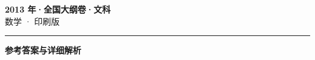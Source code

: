 \documentclass[zihao=5, a4paper]{ctexart}
\begin{document}
\begin{center}
  {\Large\bfseries 2013 年·全国大纲卷·文科}\\[4pt]
  {\large 数学 · 印刷版}
\end{center}
\medskip
{}

\par\bigskip\hrule\bigskip
{}
\Needspace{0.55\textheight}
\begin{center}{\large\bfseries 参考答案与详细解析}\end{center}
\smallskip

\end{document}
